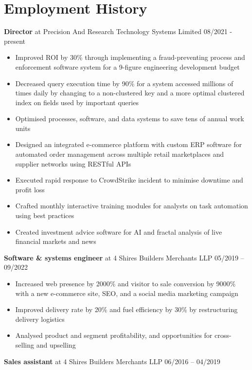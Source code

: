 \documentclass[10pt,a4paper]{article}
\begin{document}
\section*{Employment History}\vspace{-\baselineskip}\medskip
\textbf{Director} at Precision And Research Technology Systems Limited \hfill 08/2021 - present\vspace{-\baselineskip}\medskip
\begin{itemize}[noitemsep]
   \item Improved ROI by 30\% through implementing a fraud-preventing process and enforcement software system for a 9-figure engineering development budget
   \item Decreased query execution time by 90\% for a system accessed millions of times daily by changing to a non-clustered key and a more optimal clustered index on fields used by important queries
   \item Optimised processes, software, and data systems to save tens of annual work units
   \item Designed an integrated e-commerce platform with custom ERP software for automated order management across multiple retail marketplaces and supplier networks using RESTful APIs
   \item Executed rapid response to CrowdStrike incident to minimise downtime and profit loss
   \item Crafted monthly interactive training modules for analysts on task automation using best practices
   \item Created investment advice software for AI and fractal analysis of live financial markets and news
\end{itemize}
\textbf{Software \& systems engineer} at 4 Shires Builders Merchants LLP \hfill 05/2019 -- 09/2022\vspace{-\baselineskip}\medskip
\begin{itemize}[noitemsep]
   \item Increased web presence by 2000\% and visitor to sale conversion by 9000\% with a new e-commerce site, SEO, and a social media marketing campaign
   \item Improved delivery rate by 20\% and fuel efficiency by 30\% by restructuring delivery logistics
   \item Analysed product and segment profitability, and opportunities for cross-selling and upselling
\end{itemize}
\textbf{Sales assistant} at 4 Shires Builders Merchants LLP \hfill 06/2016 -- 04/2019\vspace{-\baselineskip}\medskip
\end{document}
